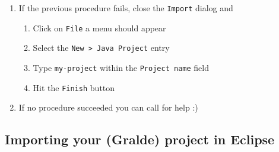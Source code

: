\documentclass[handout]{beamer}\mode<presentation>{\usetheme{AMSCesenaPurpleAndGold}}
\begin{document}
\begin{frame}[allowframebreaks]
\begin{enumerate}
        \item If the previous procedure fails, close the \texttt{Import} dialog and
        \begin{enumerate}
            \item Click on \texttt{File} a menu should appear
            \item Select the \texttt{New > Java Project} entry
            \item Type \texttt{\alert{my-project}} within the \texttt{Project name} field
            \item Hit the \texttt{Finish} button
        \end{enumerate}
        
        \item If no procedure succeeded you can call for help :)
        
    \end{enumerate}
\end{frame}

\subsection{Importing your (Gralde) project in Eclipse}
\end{document}
